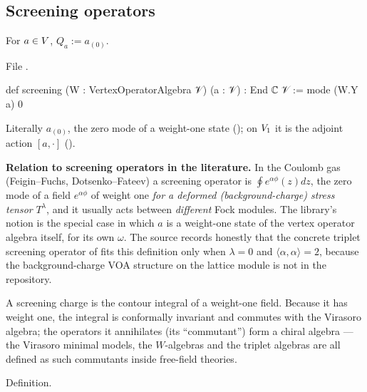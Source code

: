 \subsection{Screening operators}

\begin{definition}\label{l04:def:screening}
For $a\in V$, $Q_a := a_{(0)}$.
\end{definition}
\noindent File .
\begin{leancode}
def screening (W : VertexOperatorAlgebra 𝒱) (a : 𝒱) : End ℂ 𝒱 := mode (W.Y a) 0
\end{leancode}
\begin{dictionary}
Literally $a_{(0)}$, the zero mode  of a weight-one state
(\allowbreak{}\allowbreak{}); on $V_1$ it is the adjoint action $[a,\cdot]$
(\allowbreak{}\allowbreak{}).

\textbf{Relation to screening operators in the literature.} In the Coulomb gas (Feigin--Fuchs,
Dotsenko--Fateev) a screening operator is $\oint e^{\alpha\phi}(z)dz$, the zero mode of a field
$e^{\alpha\phi}$ of weight one \emph{for a deformed (background-charge) stress tensor} $T^\lambda$, and it
usually acts between \emph{different} Fock modules. The library's notion is the special case in
which $a$ is a weight-one state of the vertex operator algebra itself, for its own $\omega$. The source
records honestly that the concrete triplet screening operator of
 fits this definition only when
$\lambda = 0$ and $\langle\alpha,\alpha\rangle = 2$, because the background-charge VOA structure on
the lattice module is not in the repository.
\end{dictionary}
\begin{physics}
A screening charge is the contour integral of a weight-one field. Because it has weight one, the
integral is conformally invariant and commutes with the Virasoro algebra; the operators it
annihilates (its ``commutant'') form a chiral algebra --- the Virasoro minimal models, the $W$-algebras
and the triplet algebras are all defined as such commutants inside free-field theories.
\end{physics}
\begin{status}
Definition.
\end{status}

